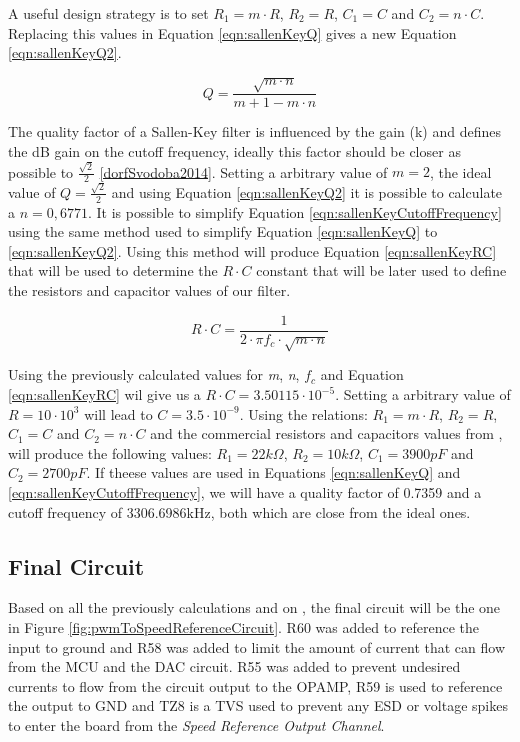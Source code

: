 		A useful design strategy is to set $R_{1}= m \cdot R$, $R_{2}=R$, $C_{1}=C$ and $C_{2}= n \cdot C$. Replacing this values in Equation \ref{eqn:sallenKeyQ} gives a new Equation \ref{eqn:sallenKeyQ2}.

		\begin{equation}\label{eqn:sallenKeyQ2}
			Q=\frac{\sqrt{m \cdot n}}{m + 1 - m \cdot n}
		\end{equation}

		The quality factor of a Sallen-Key filter is influenced by the gain (k) and defines the dB gain on the cutoff frequency, ideally this factor should be closer as possible to $\frac{\sqrt{2}}{2}$ \ref{dorfSvodoba2014}. Setting a arbitrary value of $m=2$, the ideal value of $Q=\frac{\sqrt{2}}{2}$ and using Equation \ref{eqn:sallenKeyQ2} it is possible to calculate a $n=0,6771$. It is possible to simplify Equation \ref{eqn:sallenKeyCutoffFrequency} using the same method used to simplify Equation \ref{eqn:sallenKeyQ} to \ref{eqn:sallenKeyQ2}. Using this method will produce Equation \ref{eqn:sallenKeyRC} that will be used to determine the $R \cdot C$ constant that will be later used to define the resistors and capacitor values of our filter. 

		\begin{equation}\label{eqn:sallenKeyRC}
			R \cdot C = \frac{1}{2 \cdot \pi f_{c} \cdot \sqrt{m \cdot n}}
		\end{equation}

		Using the previously calculated values for \textit{m}, \textit{n}, \textit{$f_{c}$} and Equation \ref{eqn:sallenKeyRC} wil give us a $R \cdot C = 3.50115 \cdot 10^{-5}$. Setting a arbitrary value of $R=10 \cdot 10^{3}$ will lead to $C=3.5 \cdot 10^{-9}$. Using the relations: $R_{1}= m \cdot R$, $R_{2}=R$, $C_{1}=C$ and $C_{2}= n \cdot C$ and the commercial resistors and capacitors values from \cite{burgess2015pwm}, will produce the following values: $R_{1}= 22k\Omega$, $R_{2}=10k\Omega$, $C_{1}=3900pF$ and $C_{2}= 2700pF$. If theese values are used in Equations \ref{eqn:sallenKeyQ} and \ref{eqn:sallenKeyCutoffFrequency}, we will have a  quality factor of 0.7359 and a cutoff frequency of 3306.6986kHz, both which are close from the ideal ones.

		\subsection{Final Circuit}
	
		Based on all the previously calculations and on \cite{texas1999sallenkey}, the final circuit will be the one in Figure \ref{fig:pwmToSpeedReferenceCircuit}. R60 was added to reference the input to ground and R58 was added to limit the amount of current that can flow from the MCU and the DAC circuit. R55 was added to prevent undesired currents to flow from the circuit output to the OPAMP, R59 is used to reference the output to GND and TZ8 is a TVS used to prevent any ESD or voltage spikes \cite{lepkowski2006evaluating} to enter the board from the \textit{Speed Reference Output Channel}.

